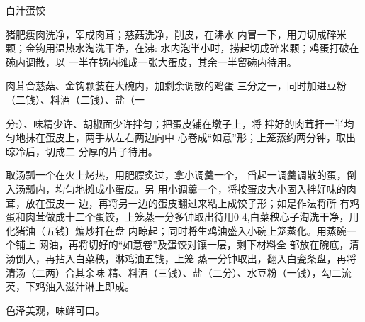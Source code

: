 \begin{recipe}[如意蛋饺]{白汁蛋饺}

\ingredients



\cooking

\step 猪肥瘦肉洗净，宰成肉茸；慈菇洗净，削皮，在沸水 内冒一下，用刀切成碎米颗；金钩用温热水淘洗干净，在沸: 水内泡半小时，捞起切成碎米颗；鸡蛋打破在碗内调散，以 一半在锅内摊成一张大蛋皮，其余一半留碗内待用。

\step 肉茸合慈菇、金钩颗装在大碗内，加剩余调散的鸡蛋 三分之一，同时加进豆粉（二钱）、料酒（二钱）、盐（一

分:）、味精少许、胡椒面少许拌匀；把蛋皮铺在墩子上，将 拌好的肉茸扞一半均匀地抹在蛋皮上，两手从左右两边向中 心卷成“如意”形；上笼蒸约两分钟，取出晾冷后，切成二 分厚的片子待用。

\step 取汤瓢一个在火上烤热，用肥膘炙过，拿小调羹一个， 舀起一调羹调散的蛋，倒入汤瓢内，均匀地摊成小蛋皮。另 用小调羹一个，将按蛋皮大小固入拌好味的肉茸，放在蛋皮一 边，再将另一边的蛋皮翻过来粘上成饺子形；如是作法将所 有鸡蛋和肉茸做成十二个蛋饺，上笼蒸一分多钟取出待用0 4,白菜秧心子淘洗干净，用化猪油（五钱〕煸炒扞在盘 内晾起；同时将生鸡油盛入小碗上笼蒸化。用蒸碗一个铺上 网油，再将切好的“如意卷”及蛋饺对镶一层，剩下材料全 部放在碗底，清汤倒入，再拈入白菜秧，淋鸡油五钱，上笼 蒸一分钟取出，翻入白瓷条盘，再将清汤（二两）合其余味 精、料酒（三钱）、盐（二分）、水豆粉（一钱），勾二流 芡，下鸡油入滋汁淋上即成。

\notes

色泽美观，味鲜可口。

\end{recipe}

